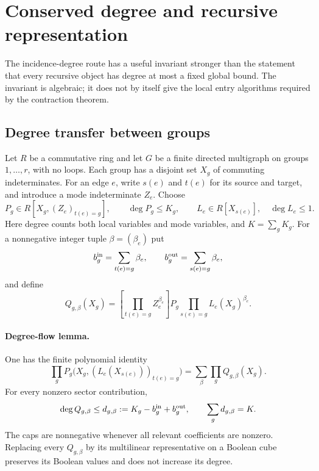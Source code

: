 \section{Conserved degree and recursive representation}
\label{sec:degree-flow-new}

The incidence-degree route has a useful invariant stronger than the
statement that every recursive object has degree at most a fixed global
bound. The invariant is algebraic; it does not by itself give the local
entry algorithms required by the contraction theorem.

\subsection{Degree transfer between groups}
Let $R$ be a commutative ring and let $G$ be a finite directed multigraph
on groups $1,\ldots,r$, with no loops. Each group has a disjoint set
$X_g$ of commuting indeterminates. For an edge $e$, write $s(e)$ and
$t(e)$ for its source and target, and introduce a mode indeterminate
$Z_e$. Choose
\[
 P_g\in R[X_g,(Z_e)_{t(e)=g}],\qquad \deg P_g\le K_g,
 \qquad
 L_e\in R[X_{s(e)}],\quad \deg L_e\le1.
\]
Here degree counts both local variables and mode variables, and
$K=\sum_gK_g$. For a nonnegative integer tuple $\beta=(\beta_e)$ put
\[
 b_g^{\rm in}=\sum_{t(e)=g}\beta_e,
 \qquad b_g^{\rm out}=\sum_{s(e)=g}\beta_e,
\]
and define
\[
 Q_{g,\beta}(X_g)=
 \left[\prod_{t(e)=g}Z_e^{\beta_e}\right]P_g
 \prod_{s(e)=g}L_e(X_g)^{\beta_e}.
\]

\paragraph{Degree-flow lemma.}
One has the finite polynomial identity
\begin{equation}\label{eq:degree-flow-identity}
 \prod_gP_g\bigl(X_g,(L_e(X_{s(e)}))_{t(e)=g}\bigr)
   =\sum_\beta\prod_g Q_{g,\beta}(X_g).
\end{equation}
For every nonzero sector contribution,
\begin{equation}\label{eq:degree-flow-caps}
 \deg Q_{g,\beta}\le d_{g,\beta}
 :=K_g-b_g^{\rm in}+b_g^{\rm out},
 \qquad
 \sum_gd_{g,\beta}=K.
\end{equation}
The caps are nonnegative whenever all relevant coefficients are nonzero.
Replacing every $Q_{g,\beta}$ by its multilinear representative on a
Boolean cube preserves its Boolean values and does not increase its degree.

